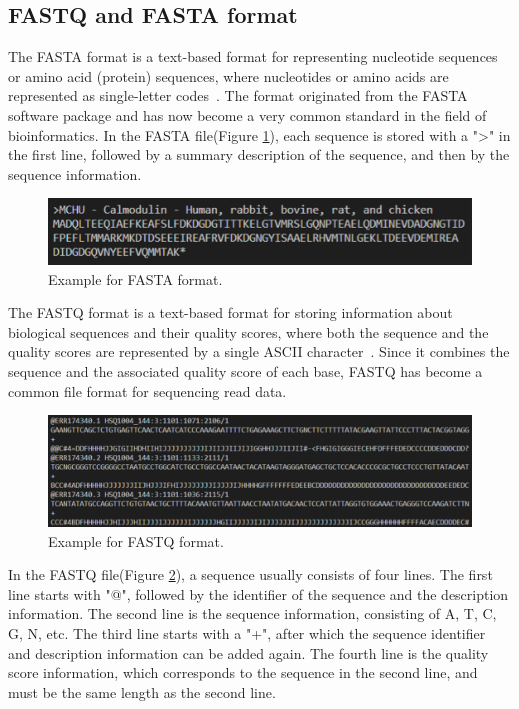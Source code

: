 \documentclass[PhD]{PHlab-thesis}
\begin{document}
\subsection{FASTQ and FASTA format}
The FASTA format is a text-based format for representing nucleotide sequences or amino acid (protein) sequences, where nucleotides or amino acids are represented as single-letter codes~\cite{Lipman1985FASTA}. The format originated from the FASTA software package and has now become a very common standard in the field of bioinformatics. In the FASTA file(Figure \ref{fig:FASTA format}), each sequence is stored with a ">" in the first line, followed by a summary description of the sequence, and then by the sequence information.

\begin{figure}[h!]
	\centering
	\includegraphics[scale=0.4]{figures/Example for FASTA format.png}
	\caption{Example for FASTA format.}
	\label{fig:FASTA format} %
\end{figure}

The FASTQ format is a text-based format for storing information about biological sequences and their quality scores, where both the sequence and the quality scores are represented by a single ASCII character~\cite{Cock2010FASTQ}. Since it combines the sequence and the associated quality score of each base, FASTQ has become a common file format for sequencing read data.

\begin{figure}[h!]
	\centering
	\includegraphics[scale=0.3]{figures/Example for FASTQ format.png}
	\caption{Example for FASTQ format.}
	\label{fig:FASTQ format} %
\end{figure}

In the FASTQ file(Figure \ref{fig:FASTQ format}), a sequence usually consists of four lines. The first line starts with "@", followed by the identifier of the sequence and the description information. The second line is the sequence information, consisting of A, T, C, G, N, etc. The third line starts with a "+", after which the sequence identifier and description information can be added again. The fourth line is the quality score information, which corresponds to the sequence in the second line, and must be the same length as the second line.
\end{document}
